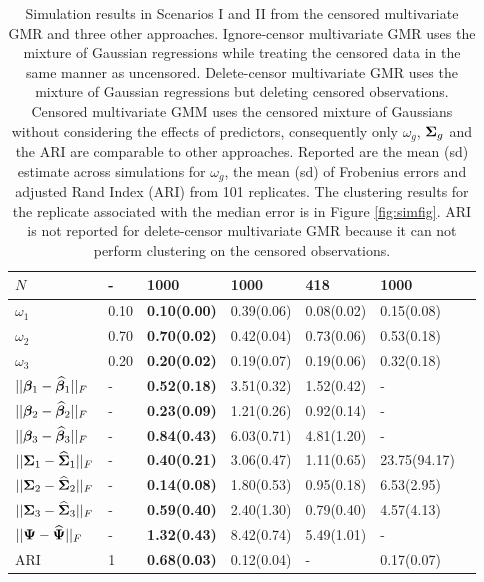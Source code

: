 \documentclass{interact}
\theoremstyle{plain}
\theoremstyle{definition}
\theoremstyle{remark}
\begin{document}
\begin{table}[H]
{\begin{tabular}{l l l l l l l}
    \midrule
    $N$ &   -    &   \textbf{1000}   &   1000   &     418   &  1000  &\\
    \midrule
    $\omega_1$ &   0.10    &   \textbf{0.10(0.00) }  &   0.39(0.06)   &     0.08(0.02)   &  0.15(0.08)  &\\
    $\omega_2$ &   0.70    &   \textbf{0.70(0.02)}   &   0.42(0.04)   &     0.73(0.06)   &  0.53(0.18) &\\
    $\omega_3$ &   0.20    &   \textbf{0.20(0.02)}   &   0.19(0.07)   &     0.19(0.06)   &  0.32(0.18) &\\
    \midrule
    $||{\bm \beta}_1-\widehat{{\bm \beta}}_1||_F$ & - &  \textbf{0.52(0.18)}   &   3.51(0.32)   &  1.52(0.42)   & -   &\\
    $||{\bm \beta}_2-\widehat{{\bm \beta}}_2||_F$ & - &  \textbf{0.23(0.09)}   &   1.21(0.26)   &  0.92(0.14)   & -   &\\
    $||{\bm \beta}_3-\widehat{{\bm \beta}}_3||_F$ & - &  \textbf{0.84(0.43)}   &   6.03(0.71)   &  4.81(1.20)   & -   &\\
    $||\bm{\Sigma}_1-\widehat{\bm{\Sigma}}_1||_F$  & - &  \textbf{0.40(0.21)}   &   3.06(0.47)   &  1.11(0.65)   & 23.75(94.17)   &\\
    $||\bm{\Sigma}_2-\widehat{\bm{\Sigma}}_2||_F$  & - &  \textbf{0.14(0.08)}   &   1.80(0.53)   &  0.95(0.18)   & 6.53(2.95)   &\\
    $||\bm{\Sigma}_3-\widehat{\bm{\Sigma}}_3||_F$  & - &  \textbf{0.59(0.40)}   &   2.40(1.30)   &  0.79(0.40)   & 4.57(4.13)   &\\
    $||\bm{\Psi}-\widehat{\bm{\Psi}}||_F$       & - &  \textbf{1.32(0.43)}   &   8.42(0.74)   &  5.49(1.01)   & -   &\\
    \midrule
    ARI       & 1 &  \textbf{0.68(0.03)}   &   0.12(0.04)   &  -   &    0.17(0.07)   &\\
    \bottomrule
    \end{tabular}
    }
    \caption{ Simulation results in Scenarios I and II from the censored multivariate GMR and three other approaches.  Ignore-censor multivariate GMR uses the mixture of Gaussian regressions while treating the censored data in the same manner as uncensored. Delete-censor multivariate GMR uses the mixture of Gaussian regressions but deleting censored observations. Censored multivariate GMM uses the censored mixture of Gaussians without considering the effects of predictors, consequently only $\omega_g$, $\bm{\Sigma}_g$ and the ARI are comparable to other approaches. Reported are the mean (sd) estimate across simulations for $\omega_g$, the mean (sd) of Frobenius errors and adjusted Rand Index (ARI) from 101 replicates. The clustering results for the replicate associated with the median error is in Figure \ref{fig:simfig}. ARI is not reported for delete-censor multivariate GMR because it can not perform clustering on the censored observations.}\label{simu_res}
\end{table}
\pagebreak
\end{document}
